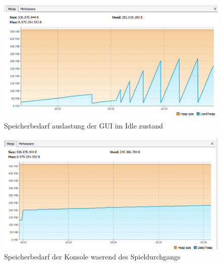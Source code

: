 \documentclass{article}
\begin{document}
\begin{figure}
  \centering
  \includegraphics{GUI_Idle.png}
  \caption{Speicherbedarf auslastung der GUI im Idle zustand}
  \label{fig:GUI_MEM_idle}
\end{figure}

\begin{figure}
  \centering
  \includegraphics{Memory_console_execute.png}
  \caption{Speicherbedarf der Konsole waerend des Spieldurchgangs}
  \label{fig:Console_mem_Execute}
\end{figure}
\end{document}
